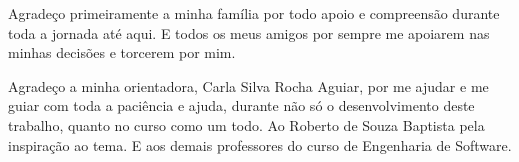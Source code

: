 \begin{agradecimentos}
  Agradeço primeiramente a minha família por todo apoio e compreensão durante toda a jornada até aqui. E todos
os meus amigos por sempre me  apoiarem nas minhas decisões e torcerem por mim.

  Agradeço a minha orientadora, Carla Silva Rocha Aguiar, por me ajudar e me guiar
 com toda a paciência e ajuda, durante não só o desenvolvimento deste trabalho, quanto no
curso como um todo. Ao Roberto de Souza Baptista pela inspiração ao tema. E aos demais professores do
curso de Engenharia de Software.

\end{agradecimentos}
